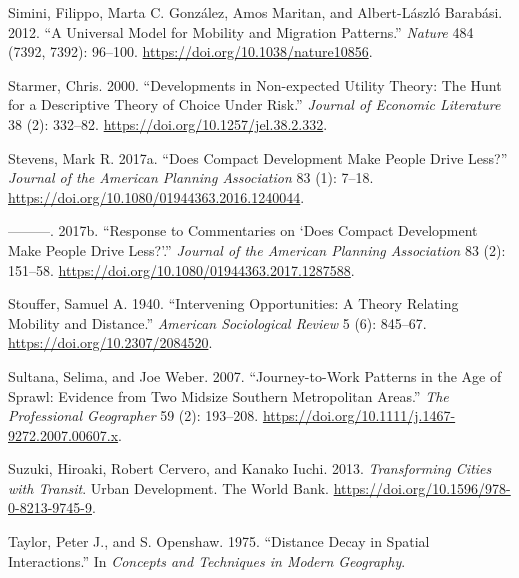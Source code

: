 \documentclass[
  12pt,
]{article}
\newlength{\cslhangindent}
\newlength{\cslentryspacingunit} %
\newenvironment{CSLReferences}[2] %
 {%
  \setlength{\parindent}{0pt}
  \ifodd #1
  \let\oldpar\par
  \def\par{\hangindent=\cslhangindent\oldpar}
  \fi
  \setlength{\parskip}{#2\cslentryspacingunit}
 }%
 {}
\begin{document}
\begin{CSLReferences}{1}{0}
\leavevmode{}%
Simini, Filippo, Marta C. González, Amos Maritan, and Albert-László Barabási. 2012. {``A Universal Model for Mobility and Migration Patterns.''} \emph{Nature} 484 (7392, 7392): 96--100. \url{https://doi.org/10.1038/nature10856}.

\leavevmode{}%
Starmer, Chris. 2000. {``Developments in {Non-expected Utility Theory}: {The Hunt} for a {Descriptive Theory} of {Choice} Under {Risk}.''} \emph{Journal of Economic Literature} 38 (2): 332--82. \url{https://doi.org/10.1257/jel.38.2.332}.

\leavevmode{}%
Stevens, Mark R. 2017a. {``Does {Compact Development Make People Drive Less}?''} \emph{Journal of the American Planning Association} 83 (1): 7--18. \url{https://doi.org/10.1080/01944363.2016.1240044}.

\leavevmode{}%
---------. 2017b. {``Response to {Commentaries} on {`{Does Compact Development Make People Drive Less}?'}.''} \emph{Journal of the American Planning Association} 83 (2): 151--58. \url{https://doi.org/10.1080/01944363.2017.1287588}.

\leavevmode{}%
Stouffer, Samuel A. 1940. {``Intervening {Opportunities}: {A Theory Relating Mobility} and {Distance}.''} \emph{American Sociological Review} 5 (6): 845--67. \url{https://doi.org/10.2307/2084520}.

\leavevmode{}%
Sultana, Selima, and Joe Weber. 2007. {``Journey-to-{Work Patterns} in the {Age} of {Sprawl}: {Evidence} from {Two Midsize Southern Metropolitan Areas}.''} \emph{The Professional Geographer} 59 (2): 193--208. \url{https://doi.org/10.1111/j.1467-9272.2007.00607.x}.

\leavevmode{}%
Suzuki, Hiroaki, Robert Cervero, and Kanako Iuchi. 2013. \emph{Transforming {Cities} with {Transit}}. Urban {Development}. {The World Bank}. \url{https://doi.org/10.1596/978-0-8213-9745-9}.

\leavevmode{}%
Taylor, Peter J., and S. Openshaw. 1975. {``Distance Decay in Spatial Interactions.''} In \emph{Concepts and {Techniques} in {Modern Geography}}.


\end{CSLReferences}
\end{document}
